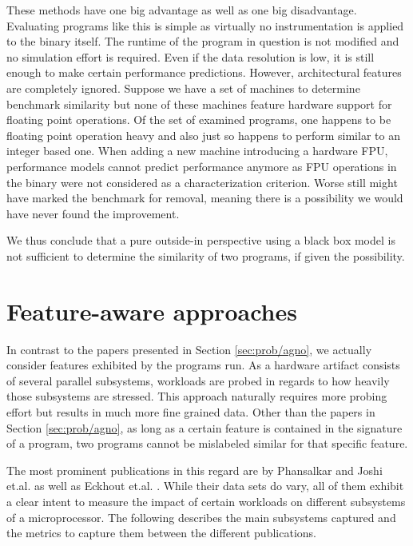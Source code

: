 \documentclass[../bachelor_paper.tex]{subfiles}
\begin{document}
These methods have one big advantage as well as one big disadvantage. Evaluating programs like this is simple as virtually no instrumentation is applied to the binary itself. The runtime of the program in question is not modified and no simulation effort is required. Even if the data resolution is low, it is still enough to make certain performance predictions. However, architectural features are completely ignored. Suppose we have a set of machines to determine benchmark similarity but none of these machines feature hardware support for floating point operations. Of the set of examined programs, one happens to be floating point operation heavy and also just so happens to perform similar to an integer based one. When adding a new machine introducing a hardware \ac{FPU}, performance models cannot predict performance anymore as \ac{FPU} operations in the binary were not considered as a characterization criterion. Worse still \cite{vandierendonckManyBenchmarksStress} might have marked the benchmark for removal, meaning there is a possibility we would have never found the improvement.

We thus conclude that a pure outside-in perspective using a black box model is not sufficient to determine the similarity of two programs, if given the possibility.

\section{Feature-aware approaches}
	\label{sec:prob/aware}
In contrast to the papers presented in Section \ref{sec:prob/agno}, we actually consider features exhibited by the programs run. As a hardware artifact consists of several parallel subsystems, workloads are probed in regards to how heavily those subsystems are stressed. This approach naturally requires more probing effort but results in much more fine grained data. Other than the papers in Section \ref{sec:prob/agno}, as long as a certain feature is contained in the signature of a program, two programs cannot be mislabeled similar for that specific feature.

The most prominent publications in this regard are by Phansalkar and Joshi et.al. \cite{phansalkarMeasuringProgramSimilarity2005,joshiMeasuringBenchmarkSimilarity2006} as well as Eckhout et.al. \cite{eeckhoutQuantifyingImpactInput}. While their data sets do vary, all of them exhibit a clear intent to measure the impact of certain workloads on different subsystems of a microprocessor. The following describes the main subsystems captured and the metrics to capture them between the different publications.
\end{document}
